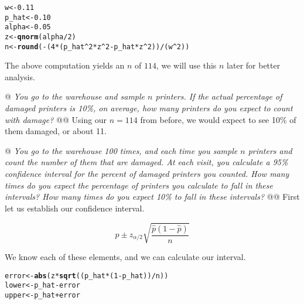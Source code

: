 \documentclass[10pt]{report}\usepackage[]{graphicx}\usepackage[]{xcolor}
\makeatletter
\newcommand{\hlnum}[1]{\textcolor[rgb]{0.686,0.059,0.569}{#1}}%
\newcommand{\hlopt}[1]{\textcolor[rgb]{0,0,0}{#1}}%
\newcommand{\hlstd}[1]{\textcolor[rgb]{0.345,0.345,0.345}{#1}}%
\newcommand{\hlkwb}[1]{\textcolor[rgb]{0.69,0.353,0.396}{#1}}%
\newcommand{\hlkwd}[1]{\textcolor[rgb]{0.737,0.353,0.396}{\textbf{#1}}}%
\newenvironment{kframe}{%
 \def\at@end@of@kframe{}%
 \ifinner\ifhmode%
  \def\at@end@of@kframe{\end{minipage}}%
  \begin{minipage}{\columnwidth}%
 \fi\fi%
 \def\FrameCommand##1{\hskip\@totalleftmargin \hskip-\fboxsep
 \colorbox{shadecolor}{##1}\hskip-\fboxsep
     \hskip-\linewidth \hskip-\@totalleftmargin \hskip\columnwidth}%
 \MakeFramed {\advance\hsize-\width
   \@totalleftmargin\z@ \linewidth\hsize
   \@setminipage}}%
 {\par\unskip\endMakeFramed%
 \at@end@of@kframe}
\newenvironment{knitrout}{}{} %
\makeatother
\begin{document}
\begin{easylist}[enumerate]
\begin{knitrout}
\color{fgcolor}\begin{kframe}
\begin{alltt}
         \hlstd{w}     \hlkwb{<-} \hlnum{0.11}
         \hlstd{p_hat} \hlkwb{<-} \hlnum{0.10}
         \hlstd{alpha} \hlkwb{<-} \hlnum{0.05}
         \hlstd{z}     \hlkwb{<-} \hlkwd{qnorm}\hlstd{(alpha} \hlopt{/} \hlnum{2}\hlstd{)}
         \hlstd{n}     \hlkwb{<-} \hlkwd{round}\hlstd{(}\hlopt{-} \hlstd{(}\hlnum{4} \hlopt{*} \hlstd{(p_hat}\hlopt{^}\hlnum{2} \hlopt{*} \hlstd{z}\hlopt{^}\hlnum{2} \hlopt{-} \hlstd{p_hat} \hlopt{*} \hlstd{z}\hlopt{^}\hlnum{2}\hlstd{))}\hlopt{/}\hlstd{(w}\hlopt{^}\hlnum{2}\hlstd{))}
\end{alltt}
\end{kframe}
\end{knitrout}


        The above computation yields an $n$ of $\boxed{114}$, we will use this $n$ later for better analysis.

        @ \textit{You go to the warehouse and sample $n$ printers. If the actual percentage of damaged printers is 10\%,
        on average, how many printers do you expect to count with damage?}
        @@ Using our $n=114$ from before, we would expect to see 10\% of them damaged, or about 11.

        @ \textit{You go to the warehouse 100 times, and each time you sample $n$ printers and count the number of them
        that are damaged. At each visit, you calculate a 95\% confidence interval for the percent of damaged printers
        you counted.  How many times do you expect the percentage of printers you calculate to fall in these intervals?
        How many times do you expect 10\% to fall in these intervals?}\newline
        @@ First let us establish our confidence interval.

        \[
            \hat{p} \pm z_{\alpha/2} \sqrt{\frac{\hat{p} (1 - \hat{p})}{n}}
        \]

        We know each of these elements, and we can calculate our interval.

\begin{knitrout}
\color{fgcolor}\begin{kframe}
\begin{alltt}
         \hlstd{error} \hlkwb{<-} \hlkwd{abs}\hlstd{(z} \hlopt{*} \hlkwd{sqrt}\hlstd{((p_hat} \hlopt{*} \hlstd{(}\hlnum{1} \hlopt{-} \hlstd{p_hat))}\hlopt{/}\hlstd{n))}
         \hlstd{lower} \hlkwb{<-} \hlstd{p_hat} \hlopt{-} \hlstd{error}
         \hlstd{upper} \hlkwb{<-} \hlstd{p_hat} \hlopt{+} \hlstd{error}
\end{alltt}
\end{kframe}
\end{knitrout}



\end{easylist}
\end{document}
